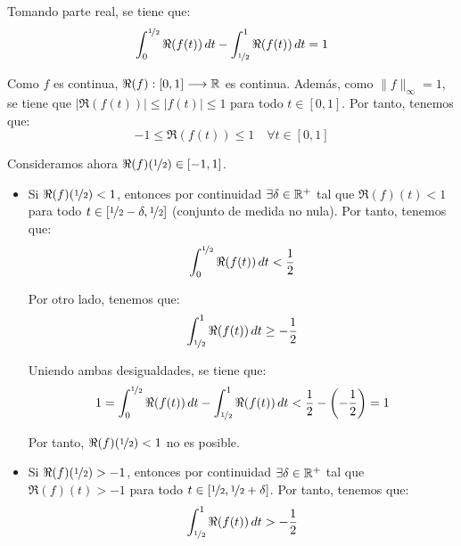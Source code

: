 \documentclass[12pt]{article}
\begin{document}
\begin{ejercicio}
\begin{description}
            Tomando parte real, se tiene que:
            \begin{equation*}
                \int_0^{\nicefrac{1}{2}} \Re(f(t))\,dt - \int_{\nicefrac{1}{2}}^1 \Re(f(t))\,dt = 1
            \end{equation*}

            Como $f$ es continua, $\Re(f): [0, 1] \longrightarrow \mathbb{R}$ es continua. Además, como $\|f\|_\infty = 1$, se tiene que $|\Re(f(t))| \leq |f(t)| \leq 1$ para todo $t \in [0, 1]$. Por tanto, tenemos que:
            \begin{equation*}
                -1 \leq \Re(f(t)) \leq 1 \quad \forall t \in [0, 1]
            \end{equation*}

            Consideramos ahora $\Re(f)(\nicefrac{1}{2})\in [-1, 1]$.
            \begin{itemize}
                \item Si $\Re(f)(\nicefrac{1}{2}) < 1$, entonces por continuidad $\exists \delta \in \mathbb{R}^+$ tal que $\Re(f)(t) < 1$ para todo $t \in [\nicefrac{1}{2} - \delta, \nicefrac{1}{2}]$ (conjunto de medida no nula). Por tanto, tenemos que:
                \begin{equation*}
                    \int_0^{\nicefrac{1}{2}} \Re(f(t))\,dt < \frac{1}{2}
                \end{equation*}

                Por otro lado, tenemos que:
                \begin{equation*}
                    \int_{\nicefrac{1}{2}}^1 \Re(f(t))\,dt \geq -\frac{1}{2}
                \end{equation*}

                Uniendo ambas desigualdades, se tiene que:
                \begin{equation*}
                    1 = \int_0^{\nicefrac{1}{2}} \Re(f(t))\,dt - \int_{\nicefrac{1}{2}}^1 \Re(f(t))\,dt < \frac{1}{2} - \left(-\frac{1}{2}\right) = 1
                \end{equation*}

                Por tanto, $\Re(f)(\nicefrac{1}{2}) < 1$ no es posible.
                \item Si $\Re(f)(\nicefrac{1}{2}) > -1$, entonces por continuidad $\exists \delta \in \mathbb{R}^+$ tal que $\Re(f)(t) > -1$ para todo $t \in [\nicefrac{1}{2}, \nicefrac{1}{2} + \delta]$. Por tanto, tenemos que:
                \begin{equation*}
                    \int_{\nicefrac{1}{2}}^1 \Re(f(t))\,dt > -\frac{1}{2}
                \end{equation*}


\end{itemize}
\end{description}
\end{ejercicio}
\end{document}
